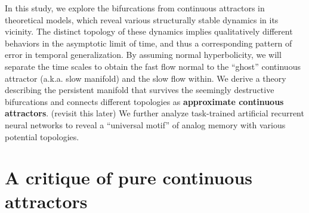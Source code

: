 \documentclass{article} %
\newcommand{\mpcomment}[1]{\textcolor{mpcolor}{(#1)}}
\newcounter{ct}
\theoremstyle{definition}
\theoremstyle{remark}
\renewcommand{\cite}{\citep}
\begin{document}
In this study, we explore the bifurcations from continuous attractors in theoretical models,
which reveal various structurally stable dynamics in its vicinity.
The distinct topology of these dynamics implies qualitatively different behaviors in the asymptotic limit of time, and thus a corresponding pattern of error in temporal generalization.
By assuming normal hyperbolicity, we will separate the time scales to obtain the fast flow normal to the ``ghost'' continuous attractor (a.k.a. slow manifold) and the slow flow within.
We derive a theory describing the persistent manifold that survives the seemingly destructive bifurcations and connects different topologies as \textbf{approximate continuous attractors}.
\mpcomment{revisit this later}
We further analyze task-trained artificial recurrent neural networks to reveal a ``universal motif'' of analog memory with various potential topologies.



\section{A critique of pure continuous attractors}\label{sec:critique}
\end{document}

